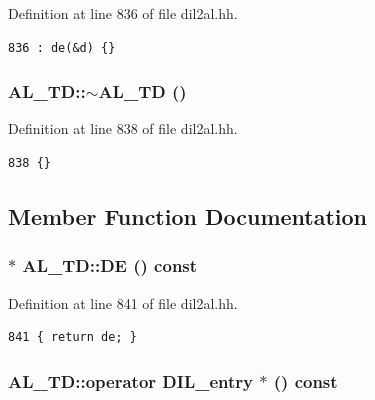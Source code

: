 Definition at line 836 of file dil2al.hh.



\footnotesize\begin{verbatim}836 : de(&d) {}
\end{verbatim}\normalsize 
{}
\subsubsection{\setlength{\rightskip}{0pt plus 5cm}AL\_\-TD::$\sim$AL\_\-TD ()\hspace{0.3cm}{\tt  [inline]}}\label{classAL__TD_a1}




Definition at line 838 of file dil2al.hh.



\footnotesize\begin{verbatim}838 {} 
\end{verbatim}\normalsize 


\subsection{Member Function Documentation}
\subsubsection{$\ast$ AL\_\-TD::DE () const\hspace{0.3cm}{\tt  [inline]}}\label{classAL__TD_a3}




Definition at line 841 of file dil2al.hh.



\footnotesize\begin{verbatim}841 { return de; }
\end{verbatim}\normalsize 
{}
\subsubsection{\setlength{\rightskip}{0pt plus 5cm}AL\_\-TD::operator {\bf DIL\_\-entry} $\ast$ () const\hspace{0.3cm}{\tt  [inline]}}\label{classAL__TD_a4}




